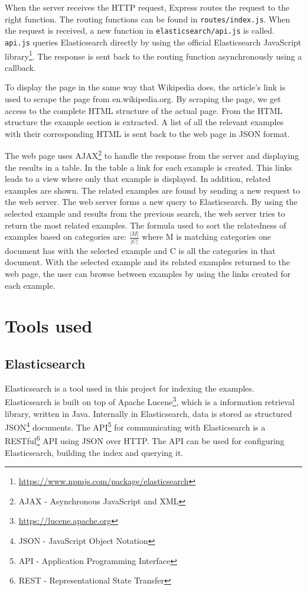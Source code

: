 When the server receives the HTTP request, Express routes the request to the right function. The routing functions can be found in \texttt{routes/index.js}. 
When the request is received, a new function in \texttt{elasticsearch/api.js} is called. \texttt{api.js} queries Elasticsearch directly by using the official Elasticsearch JavaScript  library\footnote{\url{https://www.npmjs.com/package/elasticsearch}}. The response is sent back to the routing function asynchronously using a callback.

To display the page in the same way that Wikipedia does, the article's link is used to scrape the page from en.wikipedia.org. By scraping the page, we get access to the complete HTML structure of the actual page. From the HTML structure the example section is extracted. A list of all the relevant examples with their corresponding HTML is sent back to the web page in JSON format. 

The web page uses AJAX\footnote{AJAX - Asynchronous JavaScript and XML} to handle the response from the server and displaying the results in a table. In the table a link for each example is created. This links leads to a view where only that example is displayed. In addition, related examples are shown. The related examples are found by sending a new request to the web server. The web server forms a new query to Elasticsearch. By using the selected example and results from the previous search, the web server tries to return the most related examples. The formula used to sort the relatedness of examples based on categories are: \(\frac{|M|}{|C|}\) where M is matching categories one document has with the selected example and C is all the categories in that document.
With the selected example and its related examples returned to the web page, the user can browse between examples by using the links created for each example.

\section{Tools used}

\subsection{Elasticsearch} \label{elasticsearch}

Elasticsearch is a tool used in this project for indexing the examples. Elasticsearch is built on top of Apache Lucene\footnote{\url{https://lucene.apache.org}}, which is a information retrieval library, written in Java. Internally in Elasticsearch, data is stored as structured JSON\footnote{JSON - JavaScript Object Notation} documents. The API\footnote{API - Application Programming Interface} for communicating with Elasticsearch is a RESTful\footnote{REST - Representational State Transfer} API using JSON over HTTP. The API can be used for configuring Elasticsearch, building the index and querying it. 

